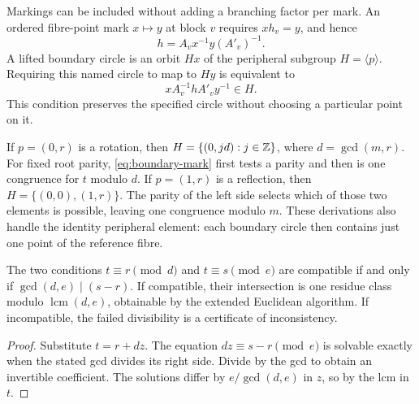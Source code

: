 Markings can be included without adding a branching factor per mark.
An ordered fibre-point mark $x\mapsto y$ at block $v$ requires
$xh_v=y$, and hence
\begin{equation}
 h=A_vx^{-1}y(A'_v)^{-1}.
 \label{eq:point-mark}
\end{equation}
A lifted boundary circle is an orbit $H x$ of the peripheral subgroup
$H=\langle p\rangle$. Requiring this named circle to map to $H y$ is
equivalent to
\begin{equation}
 xA_v^{-1}hA'_v y^{-1}\in H.
 \label{eq:boundary-mark}
\end{equation}
This condition preserves the specified circle without choosing a particular
point on it.

If $p=(0,r)$ is a rotation, then
$H=\{(0,jd):j\in\mathbb Z\}$, where $d=\gcd(m,r)$.
For fixed root parity, \eqref{eq:boundary-mark} first tests a parity and then is one congruence
for $t$ modulo $d$. If $p=(1,r)$ is a reflection, then
$H=\{(0,0),(1,r)\}$. The parity of the left side selects which of those
two elements is possible, leaving one congruence modulo $m$. These
derivations also handle the identity peripheral element: each boundary
circle then contains just one point of the reference fibre.

\begin{lemma}
\label{lem:crt}
The two conditions $t\equiv r\pmod d$ and $t\equiv s\pmod e$ are
compatible if and only if
$\gcd(d,e)\mid(s-r)$. If compatible, their intersection is one residue
class modulo $\operatorname{lcm}(d,e)$, obtainable by the extended Euclidean
algorithm. If incompatible, the failed divisibility is a certificate of
inconsistency.
\end{lemma}
\begin{proof}
Substitute $t=r+dz$. The equation $dz\equiv s-r\pmod e$ is solvable
exactly when the stated gcd divides its right side. Divide by the gcd to
obtain an invertible coefficient. The solutions differ by
$e/\gcd(d,e)$ in $z$, so by the lcm in $t$.
\end{proof}

